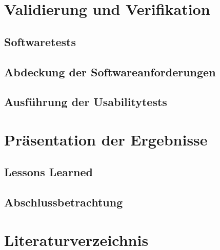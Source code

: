 \documentclass{scrreprt}
\begin{document}
\chapter{Validierung und Verifikation} \label{chap:nachweisführung}
\section{Softwaretests}
\section{Abdeckung der Softwareanforderungen}
\section{Ausführung der Usabilitytests}

\chapter{Präsentation der Ergebnisse} \label{chap:ergebnisse}
\section{Lessons Learned}
\section{Abschlussbetrachtung}

\chapter{Literaturverzeichnis}
\nocite{*}
\printbibliography
\end{document}
